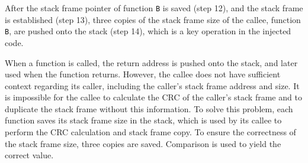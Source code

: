 After the stack frame pointer of function \texttt{B} is saved (step 12), and the stack frame is established (step 13), three copies of the stack frame size of the callee, function \texttt{B}, are pushed onto the stack (step 14), which is a key operation in the injected code. 

When a function is called, the return address is pushed onto the stack, and later used when the function returns. However, the callee does not have sufficient context regarding its caller, including the caller's stack frame address and size. It is impossible for the callee to calculate the CRC of the caller's stack frame and to duplicate the stack frame without this information. To solve this problem, each function saves its stack frame size in the stack, which is used by its callee to perform the CRC calculation and stack frame copy. To ensure the correctness of the stack frame size, three copies are saved. Comparison is used to yield the correct value. 

